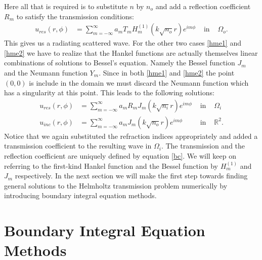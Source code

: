 \documentclass[a4paper, oneside]{discothesis}
\begin{document}
Here all that is required is to substitute $n$ by $n_o$ and add a reflection coefficient $R_m$ to satisfy the transmission conditions:
\begin{align}
	u_{res}(r,\phi) &= \sum_{m=-\infty}^{\infty} a_m T_m H_m^{(1)}(k\sqrt{n_o}r)e^{im\phi} &\text{ in }& \Omega_o.
\end{align}
This gives us a radiating scattered wave.
For the other two cases \ref{hme1} and \ref{hme2} we have to realize that the Hankel functions are actually themselves linear combinations of solutions to Bessel's equation.
Namely the Bessel function $J_m$ and the Neumann function $Y_m$.
Since in both \ref{hme1} and \ref{hme2} the point $(0,0)$ is include in the domain we must discard the Neumann function which has a singularity at this point.
This leads to the following solutions:
\begin{align}
	u_{res}(r,\phi) &=\sum_{m=-\infty}^{\infty} a_m R_m J_m(k\sqrt{n_i}r)e^{im\phi} &\text{ in } &\Omega_i \\
	u_{inc}(r,\phi) &=\sum_{m=-\infty}^{\infty} a_m J_m(k\sqrt{n_o}r)e^{im\phi} &\text{ in } &\mathbb{R}^2.
\end{align}
Notice that we again substituted the refraction indices appropriately and added a transmission coefficient to the resulting wave in $\Omega_i$.
The transmission and the reflection coefficient are uniquely defined by equation \ref{bc}.
We will keep on referring to the first-kind Hankel function and the Bessel function by $H_m^{(1)}$ and $J_m$ respectively.
In the next section we will make the first step towards finding general solutions to the Helmholtz transmission problem numerically by introducing boundary integral equation methods.

\section{Boundary Integral Equation Methods} \label{sec:BIEs}
\end{document}

